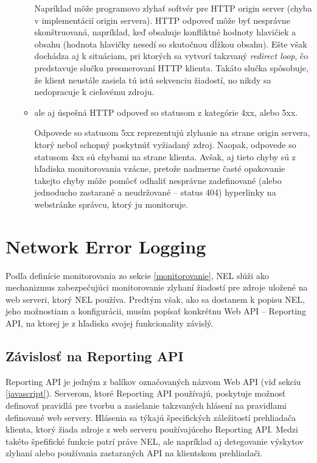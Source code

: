 \begin{enumerate}
\begin{itemize}
        Napríklad môže programovo zlyhať softvér pre HTTP origin server (chyba v implementácií origin servera).
        HTTP odpoveď môže byť nesprávne skonštruovaná, napríklad, keď obsahuje konfliktné hodnoty hlavičiek a obsahu (hodnota hlavičky  nesedí so skutočnou dĺžkou obsahu).  
        Ešte však dochádza aj k situáciam, pri ktorých sa vytvorí takzvaný \textit{redirect loop}, čo predstavuje slučku presmerovaní HTTP klienta. Takáto slučka spôsobuje, že klient neustále zasiela tú istú sekvenciu žiadostí, no nikdy sa nedopracuje k cieľovému zdroju.
        
        \item ale aj úspešná HTTP odpoveď so statusom z kategórie 4xx, alebo 5xx.

        Odpovede so statusom 5xx reprezentujú zlyhanie na strane origin servera, ktorý nebol schopný poskytnúť vyžiadaný zdroj.
        Naopak, odpovede so statusom 4xx sú chybami na strane klienta. 
        Avšak, aj tieto chyby sú z hľadiska monitorovania vzácne, pretože nadmerne časté opakovanie takejto chyby môže pomôcť odhaliť nesprávne zadefinované (alebo jednoducho zastarané a neudržované -- status 404) hyperlinky na webstránke správcu, ktorý ju monitoruje. 
    \end{itemize}
    
\end{enumerate}

\section{Network Error Logging}
\label{network-error-logging}

Podľa definície monitorovania zo sekcie \ref{monitorovanie}, NEL slúži ako mechanizmus
zabezpečujúci monitorovanie zlyhaní žiadostí pre zdroje uložené na web serveri, ktorý NEL používa.
Predtým však, ako sa dostanem k popisu NEL, jeho možnostiam a konfigurácii, musím popísať konkrétnu Web API -- Reporting API, na ktorej je z hľadiska svojej funkcionality závislý.

\subsection{Závislosť na Reporting API}
\label{reporting-api}

Reporting API je jedným z balíkov označovaných názvom Web API (viď sekciu \ref{javascript}).
Serverom, ktoré Reporting API používajú, poskytuje možnosť definovať pravidlá pre 
tvorbu a zasielanie takzvaných hlásení na pravidlami definované web servery.
Hlásenia sa týkajú špecifických záležitostí prehliadača klienta, ktorý žiada zdroje z web serveru používajúceho Reporting API.
Medzi takéto špefifické funkcie patrí práve NEL, ale napríklad aj detegovanie výskytov zlyhaní alebo používania zastaraných API na klientskom prehliadači.

